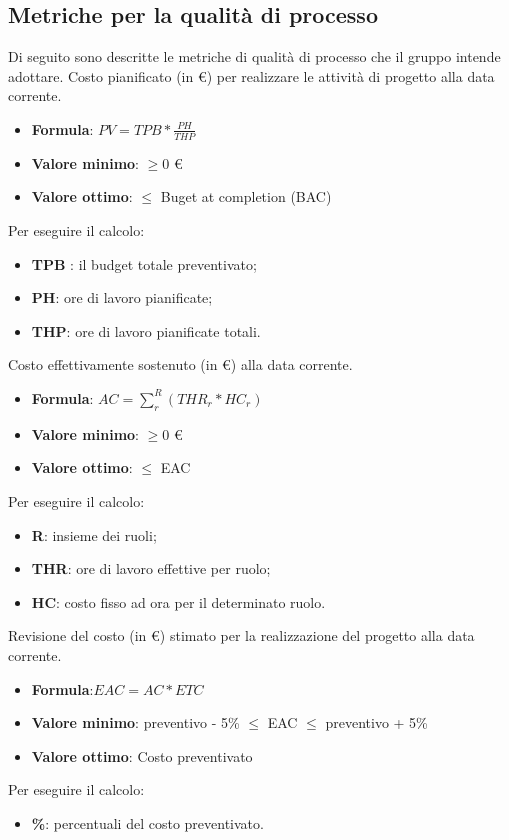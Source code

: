 \subsection{Metriche per la qualità di processo}
Di seguito sono descritte le metriche di qualità di processo che il gruppo intende adottare.
    Costo pianificato (in \euro) per realizzare le attività di progetto alla data corrente.
    \begin{itemize}
        \item \textbf{Formula}: $PV = TPB * \frac{PH}{THP}$
        \item \textbf{Valore minimo}: $\geq0$ \euro
        \item \textbf{Valore ottimo}: $\leq$ Buget at completion (BAC)
    \end{itemize}  
    Per eseguire il calcolo:
    \begin{itemize}
        \item \textbf{TPB} : il budget totale preventivato;
        \item \textbf{PH}: ore di lavoro pianificate;
        \item \textbf{THP}: ore di lavoro pianificate totali.
    \end{itemize}

Costo effettivamente sostenuto (in €) alla data corrente. 
\begin{itemize}
    \item \textbf{Formula}: $AC = \sum_{r}^{R}(THR_r*HC_r)$
    \item \textbf{Valore minimo}: $\geq0$ \euro
    \item \textbf{Valore ottimo}: $\leq$ EAC
\end{itemize}  
Per eseguire il calcolo:
\begin{itemize}
    \item \textbf{R}: insieme dei ruoli;
    \item \textbf{THR}: ore di lavoro effettive per ruolo;
    \item \textbf{HC}: costo fisso ad ora per il determinato ruolo.
\end{itemize}

Revisione del costo (in \euro) stimato per la realizzazione del progetto alla data corrente. 
\begin{itemize}
    \item \textbf{Formula}:$EAC = AC*ETC$
    \item \textbf{Valore minimo}: preventivo - 5\% $\leq$ EAC $\leq$  preventivo + 5\%
    \item \textbf{Valore ottimo}: Costo preventivato
\end{itemize}  
Per eseguire il calcolo:
\begin{itemize}
    \item \textbf{\%}: percentuali del costo preventivato.
\end{itemize}

